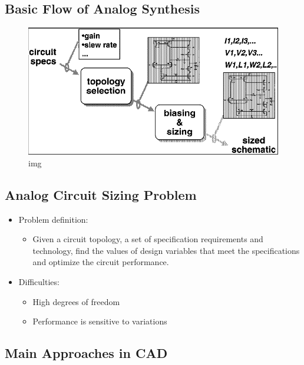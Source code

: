 \documentclass[
]{article}
\providecommand{\tightlist}{%
  \setlength{\itemsep}{0pt}\setlength{\parskip}{0pt}}
\begin{document}
\hypertarget{basic-flow-of-analog-synthesis}{%
\subsection{Basic Flow of Analog Synthesis}\label{basic-flow-of-analog-synthesis}}

\begin{figure}
\centering
\includegraphics{lec04.files/img007.png}
\caption{img}
\end{figure}

\hypertarget{analog-circuit-sizing-problem}{%
\subsection{Analog Circuit Sizing Problem}\label{analog-circuit-sizing-problem}}

\begin{itemize}
\tightlist
\item
  Problem definition:

  \begin{itemize}
  \tightlist
  \item
    Given a circuit topology, a set of specification requirements and technology, find the values of design variables that meet the specifications and optimize the circuit performance.
  \end{itemize}
\item
  Difficulties:

  \begin{itemize}
  \tightlist
  \item
    High degrees of freedom
  \item
    Performance is sensitive to variations
  \end{itemize}
\end{itemize}

\hypertarget{main-approaches-in-cad}{%
\subsection{Main Approaches in CAD}\label{main-approaches-in-cad}}
\end{document}
